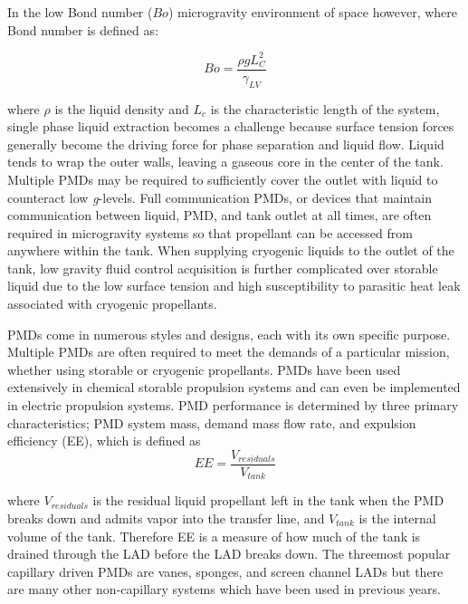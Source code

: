 \documentclass[12pt,twoside]{report}
\begin{document}
In the low Bond number ($Bo$) microgravity environment of space however, where Bond number is defined as:

\begin{equation} \label{eq:2.8}
	Bo = \dfrac{\rho g L^{2}_{C}}{\gamma _{LV}}
\end{equation}	

where $\rho$ is the liquid density and $L_{c}$ is the characteristic length of the system, single phase
liquid extraction becomes a challenge because surface tension forces generally become the driving force for phase separation and liquid flow. Liquid tends to wrap the outer walls, leaving a gaseous core in the center of the tank. Multiple PMDs may be required to sufficiently cover the outlet with liquid to counteract low \textit{g}-levels. Full communication PMDs, or devices that maintain communication between liquid, PMD, and tank outlet at all times, are often required in microgravity systems so that propellant can be accessed from anywhere within the tank. When supplying cryogenic liquids to the outlet of the tank, low gravity fluid control acquisition is further complicated over storable liquid due to the low surface tension and high susceptibility to parasitic heat leak associated with cryogenic propellants. \par

PMDs come in numerous styles and designs, each with its own specific purpose. Multiple PMDs are often required to meet the demands of a particular mission, whether using storable or cryogenic propellants. PMDs have been used extensively in chemical storable propulsion systems and can even be implemented in electric propulsion systems. PMD performance is determined by three primary characteristics; PMD system
mass, demand mass flow rate, and expulsion efficiency (EE), which is defined as
\begin{equation} \label{eq:2.9}
	EE = \dfrac{V_{residuals}}{V_{tank}}
\end{equation}

where $V_{residuals}$ is the residual liquid propellant left in the tank when the PMD breaks down
and admits vapor into the transfer line, and $V_{tank}$ is the internal volume of the tank. Therefore
EE is a measure of how much of the tank is drained through the LAD before the LAD breaks down. The threemost popular capillary driven PMDs are vanes, sponges, and screen channel LADs but there are many other non-capillary systems which have been used in previous years. \cite{hartwig2015liquid}
\end{document}
